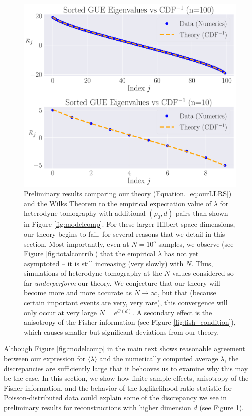 \documentclass[aps,pra, twocolumn]{revtex4}
\begin{document}
\begin{figure}[h!]
\includegraphics[width=\columnwidth]{Images/Figure_8.pdf}
 \caption{Preliminary results comparing our theory (Equation. \ref{eq:ourLLRS}) and the Wilks Theorem to the empirical expectation value of $\lambda$ for heterodyne tomography with additional $(\rho_{0}, d)$ pairs than shown in Figure \ref{fig:modelcomp}.  For these larger Hilbert space dimensions, our theory begins to fail, for several reasons that we detail in this section.  Most importantly, even at $N=10^5$ samples, we observe (see Figure \ref{fig:totalcontrib}) that the empirical $\lambda$ has not yet asymptoted -- it is still increasing (very slowly) with $N$.  Thus, simulations of heterodyne tomography at the $N$ values considered so far \emph{underperform} our theory.  We conjecture that our theory will become more and more accurate as $N\to\infty$, but that (because certain important events are very, very rare), this convergence will only occur at very large $N = e^{\mathcal{O}(d)}$.  A secondary effect is the anisotropy of the Fisher information (see Figure \ref{fig:fish_condition}), which causes smaller but significant deviations from our theory.}
\label{fig:modelcomp2}
\end{figure}
Although Figure \ref{fig:modelcomp} in the main text shows reasonable agreement between our expression for $\langle \lambda \rangle$ and the numerically computed average $\bar{\lambda}$, the discrepancies are sufficiently large that it behooves us to examine why this may be the case. In this section, we show how finite-sample effects, anisotropy of the Fisher information, and the behavior of the loglikelihood ratio statistic for Poisson-distributed data could explain some of the discrepancy we see in preliminary results for reconstructions with higher dimension $d$ (see Figure \ref{fig:modelcomp2}).
\end{document}
